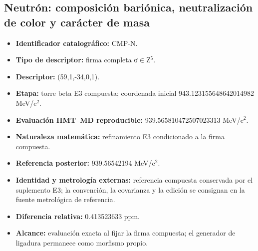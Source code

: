 \subsection{Neutrón: composición bariónica, neutralización de color y carácter de masa}
\begin{itemize}
\item \textbf{Identificador catalográfico:} CMP-N.
\item \textbf{Tipo de descriptor:} firma completa σ\(\in\)Z\({}^{5}\).
\item \textbf{Descriptor:} (59,1,-34,0,1).
\item \textbf{Etapa:} torre beta E3 compuesta; coordenada inicial 943.123155\allowbreak{}648642\allowbreak{}014982 MeV/c\({}^{2}\).
\item \textbf{Evaluación HMT--MD reproducible:} 939.565810\allowbreak{}472507\allowbreak{}023313 MeV/c\({}^{2}\).
\item \textbf{Naturaleza matemática:} refinamiento E3 condicionado a la firma compuesta.
\item \textbf{Referencia posterior:} 939.565421\allowbreak{}94 MeV/c\({}^{2}\).
\item \textbf{Identidad y metrología externas:} referencia compuesta conservada por el suplemento E3; la convención, la covarianza y la edición se consignan en la fuente metrológica de referencia.
\item \textbf{Diferencia relativa:} 0.413523\allowbreak{}633 ppm.
\item \textbf{Alcance:} evaluación exacta al fijar la firma compuesta; el generador de ligadura permanece como morfismo propio.
\end{itemize}
\endinput
\clearpage
